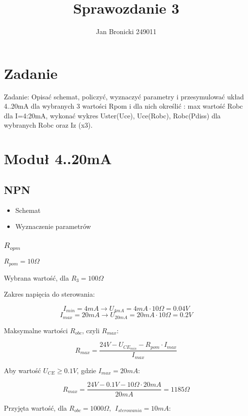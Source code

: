 \documentclass{article}
\title{Sprawozdanie 3}
\author{Jan Bronicki 249011}
\date{}
\begin{document}
\maketitle

\section{Zadanie}

Zadanie: Opisać schemat, policzyć, wyznaczyć parametry i przesymulować układ 4..20mA dla
wybranych 3 wartości Rpom i dla nich określić : max wartość Robc dla I=4:20mA, wykonać wykres
Uster(Uce), Uce(Robc), Robc(Pdiss) dla wybranych Robc oraz Iz (x3).

\section{Moduł 4..20mA}

\subsection{NPN}

\begin{itemize}
    \item Schemat
    \item Wyznaczenie parametrów
\end{itemize}

\subsubsection{$R_{opm}$}

$R_{pom} = 10 \Omega$

Wybrana wartość, dla $R_{3} = 100 \Omega$

Zakres napięcia do sterowania:

$$
    I_{min} = 4mA \rightarrow U_{4mA} = 4mA \cdot 10 \Omega = 0.04V
$$
$$
    I_{max} = 20mA \rightarrow U_{20mA} = 20mA \cdot 10 \Omega = 0.2V
$$

Maksymalne wartości $R_{obc}$, czyli $R_{max}$:

$$
    R_{max} = \frac{24V-U_{CE_{min}}-R_{pom}\cdot I_{max}}{I_{max}}
$$

Aby wartość $U_{CE} \geq 0.1V$, gdzie $I_{max}=20mA$:

$$
    R_{max}=\frac{24V-0.1V-10\Omega \cdot 20mA}{20mA}=1185\Omega
$$

Przyjęta wartość, dla $R_{obc} = 1000 \Omega, \ \ I_{sterowania} = 10mA$:
\end{document}
